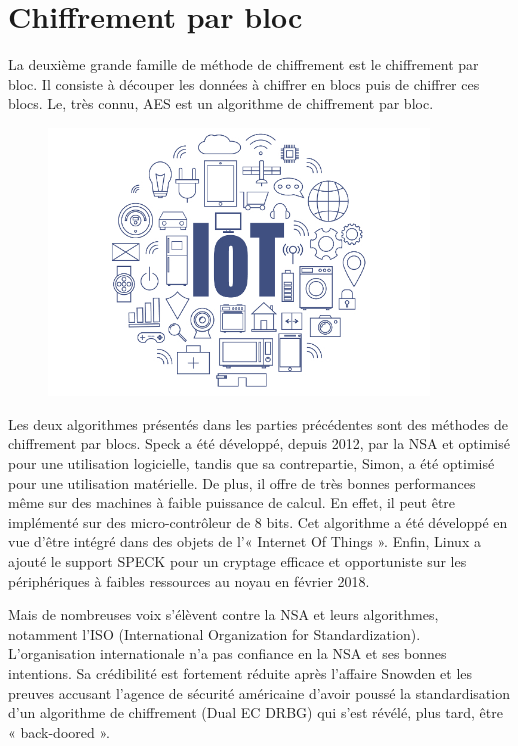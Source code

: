 \section{Chiffrement par bloc}

La deuxième grande famille de méthode de chiffrement est le chiffrement par
bloc. Il consiste à découper les données à chiffrer en blocs puis de chiffrer
ces blocs. Le, très connu, AES est un algorithme de chiffrement par bloc.

\begin{figure}[!h]
	\centering
	\includegraphics[width=0.9\textwidth]{imgs/application/IOT.jpg}
	\label{IOT}
\end{figure}

Les deux algorithmes présentés dans les parties précédentes sont des méthodes
de chiffrement par blocs. Speck a été développé, depuis 2012, par la NSA et
optimisé pour une utilisation logicielle, tandis que sa contrepartie, Simon, a
été optimisé pour une utilisation matérielle. De plus, il offre de très bonnes
performances même sur des machines à faible puissance de calcul. En effet, il
peut être implémenté sur des micro-contrôleur de 8 bits. Cet algorithme a été
développé en vue d'être intégré dans des objets de l'« Internet Of Things ».
Enfin, Linux a ajouté le support SPECK pour un cryptage efficace et
opportuniste sur les périphériques à faibles ressources au noyau en février
2018.

Mais de nombreuses voix s'élèvent contre la NSA et leurs algorithmes,
notamment l'ISO (International Organization for Standardization).
L'organisation internationale n'a pas confiance en la NSA et ses bonnes
intentions. Sa crédibilité est fortement réduite après l'affaire Snowden et
les preuves accusant l'agence de sécurité américaine d'avoir poussé la
standardisation d'un algorithme de chiffrement (Dual EC DRBG) qui s'est
révélé, plus tard, être « back-doored »\cite{NSABackdoor}.

